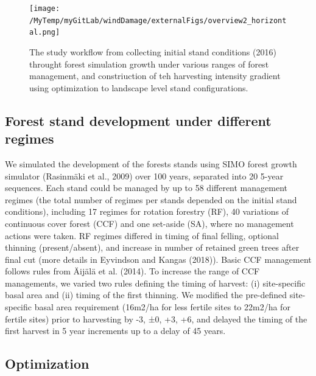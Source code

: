 \documentclass[]{elsarticle} %
\begin{document}
\begin{figure}
\centering
\texttt{[image: /MyTemp/myGitLab/windDamage/externalFigs/overview2\_horizontal.png]}
\caption{The study workflow from collecting initial stand conditions
(2016) throught forest simulation growth under various ranges of forest
management, and constriuction of teh harvesting intensity gradient using
optimization to landscape level stand configurations.\label{workflow}}
\end{figure}

\subsection{Forest stand development under different
regimes}\label{forest-stand-development-under-different-regimes}

We simulated the development of the forests stands using SIMO forest
growth simulator (Rasinmäki et al., 2009) over 100 years, separated into
20 5-year sequences. Each stand could be managed by up to 58 different
management regimes (the total number of regimes per stands depended on
the initial stand conditions), including 17 regimes for rotation
forestry (RF), 40 variations of continuous cover forest (CCF) and one
set-aside (SA), where no management actions were taken. RF regimes
differed in timing of final felling, optional thinning (present/absent),
and increase in number of retained green trees after final cut (more
details in Eyvindson and Kangas (2018)). Basic CCF management follows
rules from Äijälä et al. (2014). To increase the range of CCF
managements, we varied two rules defining the timing of harvest: (i)
site-specific basal area and (ii) timing of the first thinning. We
modified the pre-defined site-specific basal area requirement (16m2/ha
for less fertile sites to 22m2/ha for fertile sites) prior to harvesting
by -3, ±0, +3, +6, and delayed the timing of the first harvest in 5 year
increments up to a delay of 45 years.

\subsection{Optimization}\label{optimization}
\end{document}
